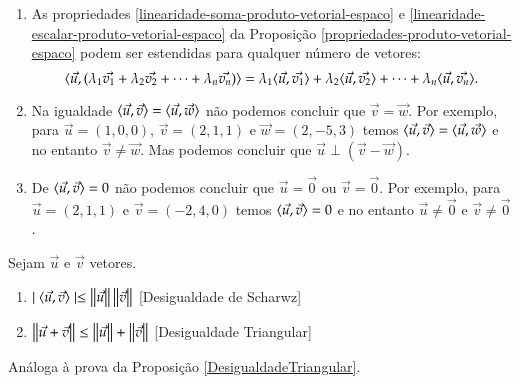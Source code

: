 \begin{observacao}
  \begin{enumerate}[label=({\alph*})]
    \item As propriedades \ref{linearidade-soma-produto-vetorial-espaco} e \ref{linearidade-escalar-produto-vetorial-espaco} da Proposi\c{c}\~ao \ref{propriedades-produto-vetorial-espaco} podem ser estendidas para qualquer n\'umero de vetores:
    \[
      \langle\vec{u}, (\lambda_1\vec{v_1} + \lambda_2\vec{v_2} + \cdots + \lambda_n\vec{v_n})\rangle = \lambda_1\langle \vec{u}, \vec{v_1} \rangle + \lambda_2\langle \vec{u}, \vec{v_2} \rangle + \cdots + \lambda_n\langle \vec{u}, \vec{v_n} \rangle.
    \]
    \item Na igualdade $\langle \vec{u}, \vec{v} \rangle = \langle \vec{u}, \vec{w} \rangle$ n\~ao podemos concluir que $\vec{v} = \vec{w}$. Por exemplo, para $\vec{u} = (1, 0, 0)$, $\vec{v} = (2, 1, 1)$ e $\vec{w} = (2, -5, 3)$ temos $\langle \vec{u}, \vec{v} \rangle = \langle \vec{u}, \vec{w} \rangle$ e no entanto $\vec{v} \ne \vec{w}$. Mas podemos concluir que $\vec{u}\perp(\vec{v} - \vec{w})$.
    \item De $\langle \vec{u}, \vec{v} \rangle = 0$ n\~ao podemos concluir que $\vec{u} = \vec{0}$ ou $\vec{v} = \vec{0}$. Por exemplo, para $\vec{u} = (2, 1, 1)$ e $\vec{v} = (-2, 4, 0)$ temos $\langle \vec{u}, \vec{v} \rangle = 0$ e no entanto $\vec{u} \ne \vec{0}$ e $\vec{v} \ne \vec{0}$.
  \end{enumerate}
\end{observacao}

\begin{proposicao}Sejam $\vec{u}$ e $\vec{v}$ vetores.
  \begin{enumerate}
    \item $\mid\langle \vec{u}, \vec{v} \rangle\mid \le \left\Vert{\vec{u}}\right\Vert\left\Vert{\vec{v}}\right\Vert$ [Desigualdade de Scharwz]
    \item $\left\Vert{\vec{u} + \vec{v}}\right\Vert \le \left\Vert{\vec{u}}\right\Vert + \left\Vert{\vec{v}}\right\Vert$ [Desigualdade Triangular]
  \end{enumerate}
\end{proposicao}
\begin{prova}
  An\'aloga \`a prova da Proposi\c{c}\~ao \ref{DesigualdadeTriangular}.
\end{prova}


